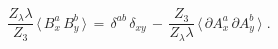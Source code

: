 \begin{equation}
  \label{BB}
  \frac{Z_\lambda \lambda}{Z_3} \,  \langle \,  B^a_x \,  B^b_y \, \rangle 
  \, = \,
  \delta^{ab} \, \delta_{xy} \, - \,  \frac{Z_3}{Z_\lambda \lambda} \,  \langle \,
      \partial A^a_x \, \partial A^b_y \, \rangle \; .
\end{equation}

